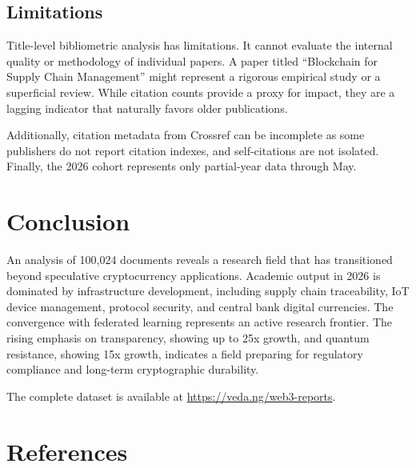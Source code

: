 \documentclass[11pt]{article}
\begin{document}
\subsection{Limitations}

Title-level bibliometric analysis has limitations. It cannot evaluate the internal quality or methodology of individual papers. A paper titled ``Blockchain for Supply Chain Management'' might represent a rigorous empirical study or a superficial review. While citation counts provide a proxy for impact, they are a lagging indicator that naturally favors older publications.

Additionally, citation metadata from Crossref can be incomplete as some publishers do not report citation indexes, and self-citations are not isolated. Finally, the 2026 cohort represents only partial-year data through May.

\section{Conclusion}
\label{sec:conclusion}

An analysis of 100,024 documents reveals a research field that has transitioned beyond speculative cryptocurrency applications. Academic output in 2026 is dominated by infrastructure development, including supply chain traceability, IoT device management, protocol security, and central bank digital currencies. The convergence with federated learning represents an active research frontier. The rising emphasis on transparency, showing up to 25x growth, and quantum resistance, showing 15x growth, indicates a field preparing for regulatory compliance and long-term cryptographic durability.

The complete dataset is available at \url{https://veda.ng/web3-reports}.

\section*{References}
\end{document}
